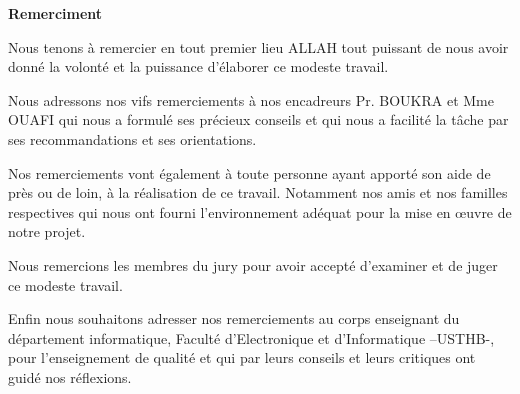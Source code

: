 
\thispagestyle{empty}

\begin{center}
	\Large\textbf{Remerciment}
\end{center}

\large{Nous tenons à remercier en tout premier lieu ALLAH tout  puissant de nous avoir donné la volonté et la puissance d’élaborer ce modeste travail.

Nous adressons nos vifs remerciements à nos encadreurs Pr. BOUKRA et Mme OUAFI qui nous a formulé ses précieux conseils et qui nous a  facilité la tâche par ses recommandations et ses  orientations.

Nos remerciements vont également à toute personne ayant apporté son aide de près ou de loin, à la réalisation de ce travail. Notamment nos amis et nos familles respectives qui nous ont fourni l'environnement adéquat pour la mise en œuvre de notre projet.

Nous remercions les membres du jury pour avoir accepté d’examiner et de juger ce modeste travail.

Enfin nous souhaitons adresser nos remerciements au corps enseignant du département informatique, Faculté d'Electronique et d'Informatique –USTHB-, pour l'enseignement de qualité et qui par leurs conseils et leurs critiques ont guidé nos réflexions.}